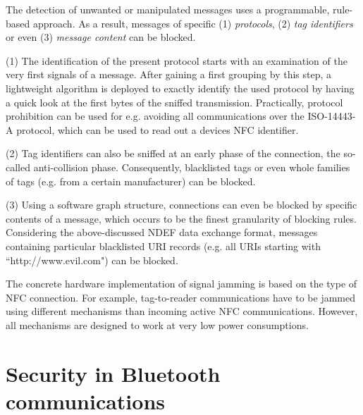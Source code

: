 \documentclass[12pt,a4paper]{article}
\begin{document}
The detection of unwanted or manipulated messages uses a programmable, rule-based approach. As a result, messages of specific (1) \emph{protocols}, (2) \emph{tag identifiers} or even (3) \emph{message content} can be blocked.

(1) The identification of the present protocol starts with an examination of the very first signals of a message. After gaining a first grouping by this step, a lightweight algorithm is deployed to exactly identify the used protocol by having a quick look at the first bytes of the sniffed transmission. Practically, protocol prohibition can be used for e.g. avoiding all communications over the ISO-14443-A protocol, which can be used to read out a devices NFC identifier.

(2) Tag identifiers can also be sniffed at an early phase of the connection, the so-called anti-collision phase. Consequently, blacklisted tags or even whole families of tags (e.g. from a certain manufacturer) can be blocked.

(3) Using a software graph structure, connections can even be blocked by specific contents of a message, which occurs to be the finest granularity of blocking rules. Considering the above-discussed NDEF data exchange format, messages containing particular blacklisted URI records (e.g. all URIs starting with ``http://www.evil.com") can be blocked.

The concrete hardware implementation of signal jamming is based on the type of NFC connection. For example, tag-to-reader communications have to be jammed using different mechanisms than incoming active NFC communications. However, all mechanisms are designed to work at very low power consumptions.

\section{Security in Bluetooth communications}
\end{document}
